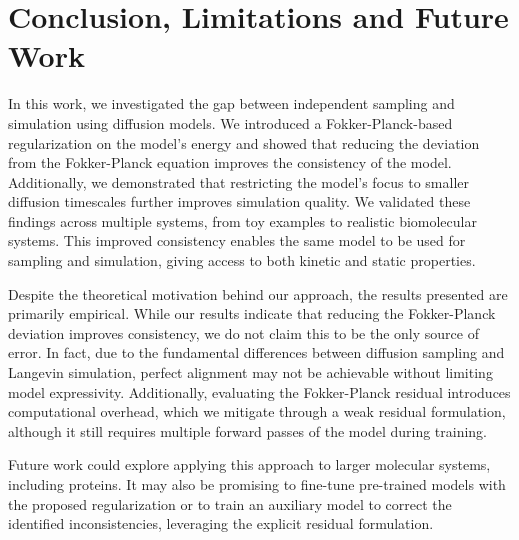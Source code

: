 \section{Conclusion, Limitations and Future Work}
\label{sec:conclusion}
In this work, we investigated the gap between independent sampling and simulation using diffusion models. We introduced a Fokker-Planck-based regularization on the model's energy and showed that reducing the deviation from the Fokker-Planck equation improves the consistency of the model. Additionally, we demonstrated that restricting the model’s focus to smaller diffusion timescales further improves simulation quality. We validated these findings across multiple systems, from toy examples to realistic biomolecular systems. This improved consistency enables the same model to be used for sampling and simulation, giving access to both kinetic and static properties.

Despite the theoretical motivation behind our approach, the results presented are primarily empirical. While our results indicate that reducing the Fokker-Planck deviation improves consistency, we do not claim this to be the only source of error. In fact, due to the fundamental differences between diffusion sampling and Langevin simulation, perfect alignment may not be achievable without limiting model expressivity. Additionally, evaluating the Fokker-Planck residual introduces computational overhead, which we mitigate through a weak residual formulation, although it still requires multiple forward passes of the model during training.

Future work could explore applying this approach to larger molecular systems, including proteins. It may also be promising to fine-tune pre-trained models with the proposed regularization or to train an auxiliary model to correct the identified inconsistencies, leveraging the explicit residual formulation.
